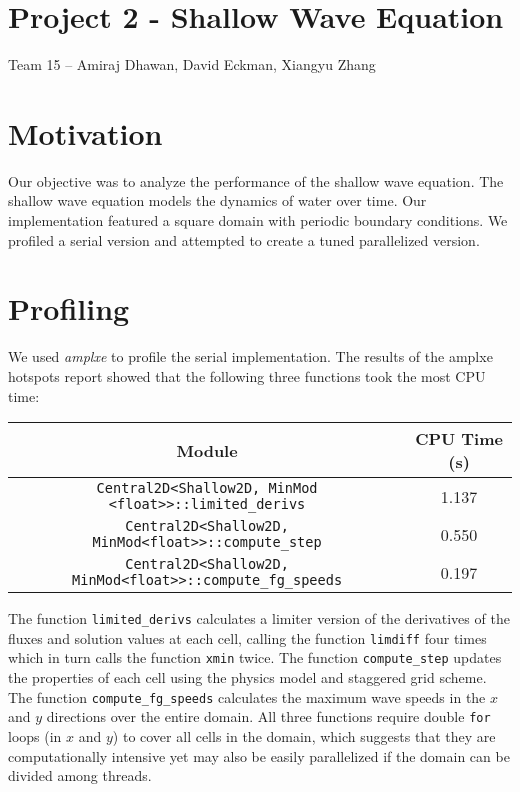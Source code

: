 \documentclass[12pt]{article}
\begin{document}
\setlength{\parindent}{24pt}


\section*{Project 2 - Shallow Wave Equation}
Team 15 \--- Amiraj Dhawan, David Eckman, Xiangyu Zhang

\section{Motivation}
Our objective was to analyze the performance of the shallow wave equation.
The shallow wave equation models the dynamics of water over time.
Our implementation featured a square domain with periodic boundary conditions.
We profiled a serial version and attempted to create a tuned parallelized version.

\section{Profiling}
We used \emph{amplxe} to profile the serial implementation.
The results of the amplxe hotspots report showed that the following three functions took the most CPU time:

\bigskip
\begin{center}
	\begin{tabular}{c|c}
		Module & CPU Time (s) \\ \hline
		\texttt{Central2D<Shallow2D, MinMod <float>>::limited\_derivs} & 1.137 \\
		\texttt{Central2D<Shallow2D, MinMod<float>>::compute\_step} & 0.550 \\       
		\texttt{Central2D<Shallow2D, MinMod<float>>::compute\_fg\_speeds} & 0.197 \\  
	\end{tabular}
\end{center}

\bigskip
The function \texttt{limited\_derivs} calculates a limiter version of the derivatives of the fluxes and solution values at each cell, calling the function \texttt{limdiff} four times which in turn calls the function \texttt{xmin} twice.
The function \texttt{compute\_step} updates the properties of each cell using the physics model and staggered grid scheme.
The function \texttt{compute\_fg\_speeds} calculates the maximum wave speeds in the $x$ and $y$ directions over the entire domain.
All three functions require double \texttt{for} loops (in $x$ and $y$) to cover all cells in the domain, which suggests that they are computationally intensive yet may also be easily parallelized if the domain can be divided among threads.
\end{document}
